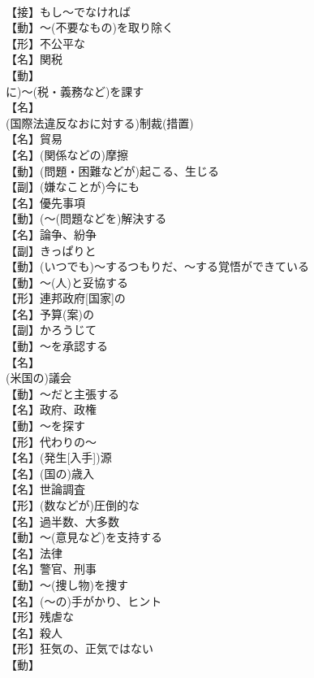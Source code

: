 \documentclass[8pt]{extreport}
\begin{document}
\begin{CJK}{UTF8}{min}
\\	【接】もし～でなければ
\\	【動】～(不要なもの)を取り除く
\\	【形】不公平な
\\	【名】関税
\\	【動】
\\	に)～(税・義務など)を課す
\\	【名】
\\	(国際法違反なおに対する)制裁(措置)
\\	【名】貿易
\\	【名】(関係などの)摩擦
\\	【動】(問題・困難などが)起こる、生じる
\\	【副】(嫌なことが)今にも
\\	【名】優先事項
\\	【動】(～(問題などを)解決する
\\	【名】論争、紛争
\\	【副】きっぱりと
\\	【動】(いつでも)～するつもりだ、～する覚悟ができている
\\	【動】～(人)と妥協する
\\	【形】連邦政府[国家]の
\\	【名】予算(案)の
\\	【副】かろうじて
\\	【動】～を承認する
\\	【名】
\\	(米国の)議会
\\	【動】～だと主張する
\\	【名】政府、政権
\\	【動】～を探す
\\	【形】代わりの～
\\	【名】(発生[入手])源
\\	【名】(国の)歳入
\\	【名】世論調査
\\	【形】(数などが)圧倒的な
\\	【名】過半数、大多数
\\	【動】～(意見など)を支持する
\\	【名】法律
\\	【名】警官、刑事
\\	【動】～(捜し物)を捜す
\\	【名】(～の)手がかり、ヒント
\\	【形】残虐な
\\	【名】殺人
\\	【形】狂気の、正気ではない
\\	【動】

\end{CJK}
\end{document}
